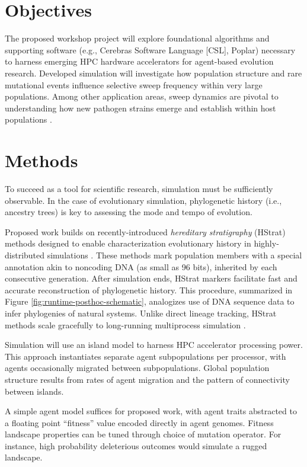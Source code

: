 \section{Objectives}

The proposed workshop project will explore foundational algorithms and supporting software (e.g., Cerebras Software Language [CSL], Poplar) necessary to harness emerging HPC hardware accelerators for agent-based evolution research.
Developed simulation will investigate how population structure and rare mutational events influence selective sweep frequency within very large populations.
Among other application areas, sweep dynamics are pivotal to understanding how new pathogen strains emerge and establish within host populations \cite{markov2023evolution}.

\section{Methods}

To succeed as a tool for scientific research, simulation must be sufficiently observable.
In the case of evolutionary simulation, phylogenetic history (i.e., ancestry trees) is key to assessing the mode and tempo of evolution.



Proposed work builds on recently-introduced \textit{hereditary stratigraphy} (HStrat) methods designed to enable characterization evolutionary history in highly-distributed simulations \cite{moreno2022hstrat}.
These methods mark population members with a special annotation akin to noncoding DNA (as small as 96 bits), inherited by each consecutive generation.
After simulation ends, HStrat markers facilitate fast and accurate reconstruction of phylogenetic history.
This procedure, summarized in Figure \ref{fig:runtime-posthoc-schematic}, analogizes use of DNA sequence data to infer phylogenies of natural systems.
Unlike direct lineage tracking, HStrat methods scale gracefully to long-running multiprocess simulation \cite{moreno2024analysis}.

Simulation will use an island model to harness HPC accelerator processing power.
This approach instantiates separate agent subpopulations per processor, with agents occasionally migrated between subpopulations.
Global population structure results from rates of agent migration and the pattern of connectivity between islands.

A simple agent model suffices for proposed work, with agent traits abstracted to a floating point ``fitness'' value encoded directly in agent genomes.
Fitness landscape properties can be tuned through choice of mutation operator.
For instance, high probability deleterious outcomes would simulate a rugged landscape.

